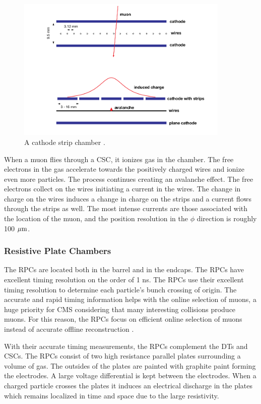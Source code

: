 \begin{figure}[h!]
  \centering
  \includegraphics[width=4in]{images/CSC.png}
  \caption[A cathode strip chamber.]
   {A cathode strip chamber \cite{mutdr}.}
  \label{fig:csc}
\end{figure}
When a muon flies through a CSC, it ionizes gas in the chamber. The free electrons in the gas accelerate towards the positively charged wires and ionize even more particles. The process continues creating an avalanche effect. The free electrons collect on the wires initiating a current in the wires. The change in charge on the wires induces a change in charge on the strips and a current flows through the strips as well. The most intense currents are those associated with the location of the muon, and the position resolution in the $\phi$ direction is roughly 100 ${\rm \mu m}$.

\FloatBarrier
\subsubsection{Resistive Plate Chambers}

The RPCs are located both in the barrel and in the endcaps. The RPCs have excellent timing resolution on the order of 1 ns. The RPCs use their excellent timing resolution to determine each particle's bunch crossing of origin. The accurate and rapid timing information helps with the online selection of muons, a huge priority for CMS considering that many interesting collisions produce muons. For this reason, the RPCs focus on efficient online selection of muons instead of accurate offline reconstruction \cite{cmsexp}.

With their accurate timing measurements, the RPCs complement the DTs and CSCs. The RPCs consist of two high resistance parallel plates surrounding a volume of gas. The outsides of the plates are painted with graphite paint forming the electrodes. A large voltage differential is kept between the electrodes. When a charged particle crosses the plates it induces an electrical discharge in the plates which remains localized in time and space due to the large resistivity.

